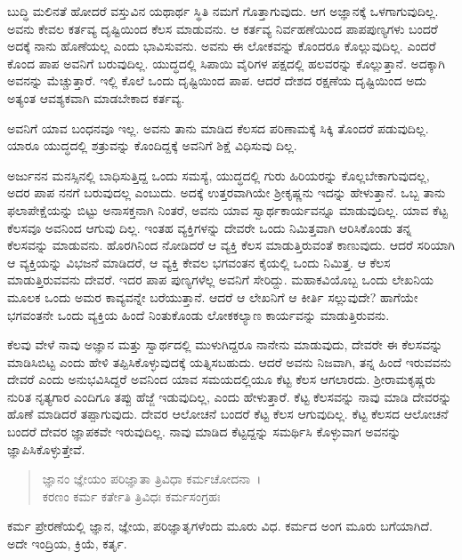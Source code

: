 ಬುದ್ಧಿ ಮಲಿನತೆ ಹೋದರೆ ವಸ್ತುವಿನ ಯಥಾರ್ಥ ಸ್ಥಿತಿ ನಮಗೆ ಗೊತ್ತಾಗುವುದು. ಆಗ ಅಜ್ಞಾನಕ್ಕೆ ಒಳಗಾಗುವುದಿಲ್ಲ. ಅವನು ಕೇವಲ ಕರ್ತವ್ಯ ದೃಷ್ಟಿಯಿಂದ ಕೆಲಸ ಮಾಡುವನು. ಆ ಕರ್ತವ್ಯ ನಿರ್ವಹಣೆಯಿಂದ ಪಾಪಪುಣ್ಯಗಳು ಬಂದರೆ ಅದಕ್ಕೆ ನಾನು ಹೊಣೆಯಲ್ಲ ಎಂದು ಭಾವಿಸುವನು. ಅವನು ಈ ಲೋಕವನ್ನು ಕೊಂದರೂ ಕೊಲ್ಲುವುದಿಲ್ಲ. ಎಂದರೆ ಕೊಂದ ಪಾಪ ಅವನಿಗೆ ಬರುವುದಿಲ್ಲ. ಯುದ್ಧದಲ್ಲಿ ಸಿಪಾಯಿ ವೈರಿಗಳ ಪಕ್ಷದಲ್ಲಿ ಹಲವರನ್ನು ಕೊಲ್ಲುತ್ತಾನೆ. ಅದಕ್ಕಾಗಿ ಅವನನ್ನು ಮೆಚ್ಚುತ್ತಾರೆ. ಇಲ್ಲಿ ಕೊಲೆ ಒಂದು ದೃಷ್ಟಿಯಿಂದ ಪಾಪ. ಆದರೆ ದೇಶದ ರಕ್ಷಣೆಯ ದೃಷ್ಟಿಯಿಂದ ಅದು ಅತ್ಯಂತ ಆವಶ್ಯಕವಾಗಿ ಮಾಡಬೇಕಾದ ಕರ್ತವ್ಯ.

ಅವನಿಗೆ ಯಾವ ಬಂಧನವೂ ಇಲ್ಲ. ಅವನು ತಾನು ಮಾಡಿದ ಕೆಲಸದ ಪರಿಣಾಮಕ್ಕೆ ಸಿಕ್ಕಿ ತೊಂದರೆ ಪಡುವುದಿಲ್ಲ. ಯಾರೂ ಯುದ್ಧದಲ್ಲಿ ಶತ್ರುವನ್ನು ಕೊಂದಿದ್ದಕ್ಕೆ ಅವನಿಗೆ ಶಿಕ್ಷೆ ವಿಧಿಸುವು ದಿಲ್ಲ.

ಅರ್ಜುನನ ಮನಸ್ಸಿನಲ್ಲಿ ಬಾಧಿಸುತ್ತಿದ್ದ ಒಂದು ಸಮಸ್ಯೆ, ಯುದ್ಧದಲ್ಲಿ ಗುರು ಹಿರಿಯರನ್ನು ಕೊಲ್ಲಬೇಕಾಗುವುದಲ್ಲ, ಅದರ ಪಾಪ ನನಗೆ ಬರುವುದಲ್ಲ ಎಂಬುದು. ಅದಕ್ಕೆ ಉತ್ತರವಾಗಿಯೇ ಶ‍್ರೀಕೃಷ್ಣನು ಇದನ್ನು ಹೇಳುತ್ತಾನೆ. ಒಬ್ಬ ತಾನು ಫಲಾಪೇಕ್ಷೆಯನ್ನು ಬಿಟ್ಟು ಅನಾಸಕ್ತನಾಗಿ ನಿಂತರೆ, ಅವನು ಯಾವ ಸ್ವಾರ್ಥಕಾರ್ಯವನ್ನೂ ಮಾಡುವುದಿಲ್ಲ. ಯಾವ ಕೆಟ್ಟ ಕೆಲಸವೂ ಅವನಿಂದ ಆಗುವು ದಿಲ್ಲ. ಇಂತಹ ವ್ಯಕ್ತಿಗಳನ್ನು ದೇವರೇ ಒಂದು ನಿಮಿತ್ತವಾಗಿ ಆರಿಸಿಕೊಂಡು ತನ್ನ ಕೆಲಸವನ್ನು ಮಾಡುವನು. ಹೊರಗಿನಿಂದ ನೋಡಿದರೆ ಆ ವ್ಯಕ್ತಿ ಕೆಲಸ ಮಾಡುತ್ತಿರುವಂತೆ ಕಾಣುವುದು. ಆದರೆ ಸರಿಯಾಗಿ ಆ ವ್ಯಕ್ತಿಯನ್ನು ವಿಭಜನೆ ಮಾಡಿದರೆ, ಆ ವ್ಯಕ್ತಿ ಕೇವಲ ಭಗವಂತನ ಕೈಯಲ್ಲಿ ಒಂದು ನಿಮಿತ್ತ. ಆ ಕೆಲಸ ಮಾಡುತ್ತಿರುವವನು ದೇವರೆ. ಇದರ ಪಾಪ ಪುಣ್ಯಗಳೆಲ್ಲ ಅವನಿಗೆ ಸೇರಿದ್ದು. ಮಹಾಕವಿಯೊಬ್ಬ ಒಂದು ಲೇಖನಿಯ ಮೂಲಕ ಒಂದು ಅಮರ ಕಾವ್ಯವನ್ನೇ ಬರೆಯುತ್ತಾನೆ. ಆದರೆ ಆ ಲೇಖನಿಗೆ ಆ ಕೀರ್ತಿ ಸಲ್ಲುವುದೇ? ಹಾಗೆಯೇ ಭಗವಂತನೇ ಒಂದು ವ್ಯಕ್ತಿಯ ಹಿಂದೆ ನಿಂತುಕೊಂಡು ಲೋಕಕಲ್ಯಾಣ ಕಾರ್ಯವನ್ನು ಮಾಡುತ್ತಿರುವನು.\enginline{}

ಕೆಲವು ವೇಳೆ ನಾವು ಅಜ್ಞಾನ ಮತ್ತು ಸ್ವಾರ್ಥದಲ್ಲಿ ಮುಳುಗಿದ್ದರೂ ನಾನೇನು ಮಾಡುವುದು, ದೇವರೇ ಈ ಕೆಲಸವನ್ನು ಮಾಡಿಸಿಬಿಟ್ಟ ಎಂದು ಹೇಳಿ ತಪ್ಪಿಸಿಕೊಳ್ಳುವುದಕ್ಕೆ ಯತ್ನಿಸಬಹುದು. ಆದರೆ ಅವನು ನಿಜವಾಗಿ, ತನ್ನ ಹಿಂದೆ ಇರುವವನು ದೇವರೆ ಎಂದು ಅನುಭವಿಸಿದ್ದರೆ ಅವನಿಂದ ಯಾವ ಸಮಯದಲ್ಲಿಯೂ ಕೆಟ್ಟ ಕೆಲಸ ಆಗಲಾರದು. ಶ‍್ರೀರಾಮಕೃಷ್ಣರು ನುರಿತ ನೃತ್ಯಗಾರ ಎಂದಿಗೂ ತಪ್ಪು ಹೆಜ್ಜೆ ಇಡುವುದಿಲ್ಲ, ಎಂದು ಹೇಳುತ್ತಾರೆ. ಕೆಟ್ಟ ಕೆಲಸವನ್ನು ನಾವು ಮಾಡಿ ದೇವರನ್ನು ಹೊಣೆ ಮಾಡಿದರೆ ತಪ್ಪಾಗುವುದು. ದೇವರ ಆಲೋಚನೆ ಬಂದರೆ ಕೆಟ್ಟ ಕೆಲಸ ಆಗುವುದಿಲ್ಲ. ಕೆಟ್ಟ ಕೆಲಸದ ಆಲೋಚನೆ ಬಂದರೆ ದೇವರ ಜ್ಞಾಪಕವೇ ಇರುವುದಿಲ್ಲ. ನಾವು ಮಾಡಿದ ಕೆಟ್ಟದ್ದನ್ನು ಸಮರ್ಥಿಸಿ ಕೊಳ್ಳುವಾಗ ಅವನನ್ನು ಜ್ಞಾಪಿಸಿಕೊಳ್ಳುತ್ತೇವೆ.

\begin{verse}
ಜ್ಞಾನಂ ಜ್ಞೇಯಂ ಪರಿಜ್ಞಾತಾ ತ್ರಿವಿಧಾ ಕರ್ಮಚೋದನಾ~। \\ಕರಣಂ ಕರ್ಮ ಕರ್ತೇತಿ ತ್ರಿವಿಧಃ ಕರ್ಮಸಂಗ್ರಹಃ 
\end{verse}

{\small ಕರ್ಮ ಪ್ರೇರಣೆಯಲ್ಲಿ ಜ್ಞಾನ, ಜ್ಞೇಯ, ಪರಿಜ್ಞಾತೃಗಳೆಂದು ಮೂರು ವಿಧ. ಕರ್ಮದ ಅಂಗ ಮೂರು ಬಗೆಯಾಗಿದೆ. ಅದೇ ಇಂದ್ರಿಯ, ಕ್ರಿಯೆ, ಕರ್ತೃ.}

